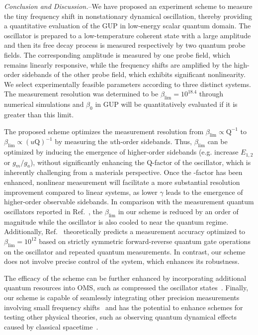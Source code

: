 \documentclass[aps,prl,twocolumn,superscriptaddress]{revtex4-2}
\begin{document}

\textit{Conclusion and Discussion.}--We have proposed an experiment scheme to measure the tiny frequency shift in nonstationary dynamical oscillation, thereby providing a quantitative evaluation of the GUP in low-energy scalar quantum domain.  The oscillator is prepared to a low-temperature coherent state with a large amplitude and then its free decay process is measured respectively by two quantum probe fields. The corresponding  amplitude is measured by one probe field, which remains linearly responsive, while the frequency shifts are amplified by the high-order sidebands of the other probe field, which exhibits significant nonlinearity. We select experimentally feasible parameters according to three distinct systems. The measurement resolution  was determined to be $\beta_{\text{lim}}=10^{18.4}$ through numerical simulations and $\beta_0$ in GUP will be quantitatively evaluated if it is greater than this limit.

The proposed scheme optimizes the measurement resolution from $\beta_{\text{lim}}\propto \text{Q}^{-1}$ to  $\beta_{\text{lim}}\propto (u\text{Q})^{-1}$ by measuring the $u$th-order sidebands. Thus, $\beta_{\text{lim}}$ can be optimized by inducing the emergence of higher-order sidebands (e.g. increase $E_{1,2}$ or $g_m/g_a$), without significantly enhancing the $\text{Q}$-factor of the oscillator, which is inherently challenging from a materials perspective. Once the -factor has been enhanced, nonlinear measurement will facilitate a more substantial resolution improvement compared to linear systems, as lower $\gamma$ leads to the emergence of higher-order observable sidebands. In comparison with the measurement quantum oscillators reported in Ref.~\cite{Li2025}, the $\beta_{\text{lim}}$ in our scheme is reduced by an order of magnitude while the oscillator is also cooled to near the quantum regime. Additionally, Ref.~\cite{Pikovski2012} theoretically predicts a measurement accuracy optimized to $\beta_{\text{lim}}=10^{12}$ based on strictly symmetric forward-reverse quantum gate operations on the oscillator and repeated quantum measurements. In contrast, our scheme does not involve precise control of the system, which enhances its robustness.

The efficacy of the scheme can be further enhanced by  incorporating additional quantum resources into OMS, such as compressed the oscillator states~\cite{Marti2024}. Finally, our scheme is capable of seamlessly integrating other precision measurements involving small frequency shifts~\cite{He2015} and has the potential to enhance schemes for testing other physical theories, such as observing quantum dynamical effects caused by classical spacetime~\cite{Yang2013}.
\end{document}
